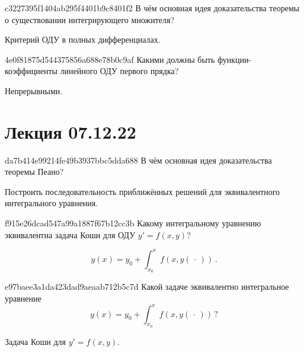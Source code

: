 \begin{note}{c3227395f1404ab295f4401b9c8401f2}
    В чём основная идея доказательства теоремы о существовании интегрирующего множителя?

    \begin{cloze}{1}
        Критерий ОДУ в полных дифференциалах.
    \end{cloze}
\end{note}

\begin{note}{4e0f81875d544375856a688e78b0c9af}
    Какими должны быть функции-коэффициенты линейного ОДУ первого прядка?

    \begin{cloze}{1}
        Непрерывными.
    \end{cloze}
\end{note}

\section{Лекция 07.12.22}
\begin{note}{da7b414e99214fe49b3937bbc5dda688}
    В чём основная идея доказательства теоремы Пеано?

    \begin{cloze}{1}
        Построить последовательность приближённых решений для эквивалентного интегрального уравнения.
    \end{cloze}
\end{note}

\begin{note}{f915e26dcad547a99a1887f67b12cc3b}
    Какому интегральному уравнению эквивалентна задача Коши для ОДУ \({ y' = f(x, y) }\)?

    \begin{cloze}{1}
        \[
            y(x) = y_0 + \int_{x_0}^{x} f(x, y(\,\cdot\,))\,.
        \]
    \end{cloze}
\end{note}

\begin{note}{e97baee3a1da423dad9aeaab712b5c7d}
    Какой задаче эквивалентно интегральное уравнение
    \[
        y(x) = y_0 + \int_{x_0}^{x} f(x, y(\,\cdot\,))\,?
    \]

    \begin{cloze}{1}
        Задача Коши для \({ y' = f(x, y) }\).
    \end{cloze}
\end{note}


